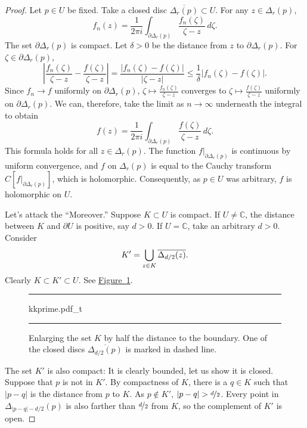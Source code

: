 \documentclass[12pt,openany]{book}
\newcommand{\avoidbreak}{\postdisplaypenalty=100}
\newcommand{\sabs}[1]{\lvert {#1} \rvert}
\newcommand{\abs}[1]{\left\lvert {#1} \right\rvert}
\newcommand{\C}{{\mathbb{C}}}
\newcommand{\myquote}[1]{``#1''}
\theoremstyle{plain}
\theoremstyle{remark}
\theoremstyle{definition}
\newenvironment{myfig}{%
\begin{figure}[h!t]
\noindent\rule{\textwidth}{0.5pt}\vspace{12pt}\par\centering}%
{\par\noindent\rule{\textwidth}{0.5pt}
\end{figure}}
\theoremstyle{exercise}
\theoremstyle{example}
\newcommand{\figureref}[1]{\hyperref[#1]{Figure~\ref*{#1}}}
\begin{document}
\begin{proof}
Let $p \in U$ be fixed.
Take a closed disc $\overline{\Delta_r(p)} \subset U$.
For any $z \in \Delta_r(p)$,
\begin{equation*}
f_n(z) = \frac{1}{2\pi i}
\int_{\partial \Delta_r(p)} \frac{f_n(\zeta)}{\zeta-z} \, d\zeta .
\end{equation*}
The set $\partial \Delta_r(p)$ is compact.
Let $\delta > 0$ be the distance from $z$ to
$\partial \Delta_r(p)$.
For $\zeta \in \partial \Delta_r(p)$,
\begin{equation*}
\abs{\frac{f_n(\zeta)}{\zeta-z}
-
\frac{f(\zeta)}{\zeta-z}
}
=
\frac{\sabs{f_n(\zeta)-f(\zeta)}}{\sabs{\zeta-z}}
\leq
\frac{1}{\delta}
\sabs{f_n(\zeta)-f(\zeta)} .
\end{equation*}
Since $f_n \to f$ uniformly on $\partial \Delta_r(p)$,
$\zeta \mapsto \frac{f_n(\zeta)}{\zeta-z}$ converges to 
$\zeta \mapsto \frac{f(\zeta)}{\zeta-z}$ uniformly on $\partial \Delta_r(p)$.
We can, therefore, take the limit as $n \to \infty$ underneath the integral
to obtain
\begin{equation*}
f(z) = \frac{1}{2\pi i}
\int_{\partial \Delta_r(p)} \frac{f(\zeta)}{\zeta-z} \, d\zeta .
\end{equation*}
This formula holds for all $z \in \Delta_r(p)$.
The function $f|_{\partial \Delta_r(p)}$ is continuous by uniform
convergence, and $f$ on $\Delta_r(p)$ is equal to
the Cauchy transform
$C[f|_{\partial \Delta_r(p)}]$, which is holomorphic.  Consequently,
as $p \in U$ was arbitrary,
$f$ is holomorphic on $U$.

Let's attack the \myquote{Moreover.}
Suppose $K \subset U$ is compact.  If $U \neq \C$,
the distance between $K$ and $\partial U$ is positive, say $d > 0$.
If $U=\C$, take an arbitrary $d > 0$.  Consider 
\begin{equation*}
K' = \bigcup_{z \in K} \overline{\Delta_{d/2}(z)} .
\avoidbreak
\end{equation*}
Clearly $K \subset K' \subset U$.
See \figureref{fig:kkprime}.

\begin{myfig}
{kkprime.pdf_t}
\caption{Enlarging the set $K$ by half the distance to the boundary.  One of
the closed discs $\overline{\Delta_{d/2}(p)}$ is marked in dashed line.\label{fig:kkprime}}
\end{myfig}

The set $K'$ is also compact: It is clearly
bounded, let us show it is closed.  Suppose that $p$ is not in $K'$.
By compactness of $K$, there is a $q \in K$ such that $\sabs{p-q}$
is the distance from $p$ to $K$.  As $p \notin K'$,
$\sabs{p-q} > \nicefrac{d}{2}$.
Every point in $\Delta_{\sabs{p-q}-d/2}(p)$
is also farther than $\nicefrac{d}{2}$ from $K$, so
the complement of $K'$ is open.


\end{proof}
\end{document}
